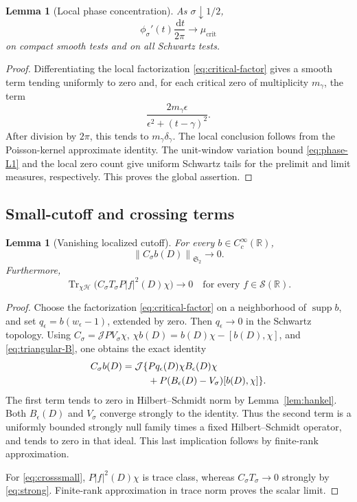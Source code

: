 \documentclass[11pt]{article}
\numberwithin{equation}{section}
\newtheorem{lemma}[theorem]{Lemma}
\theoremstyle{definition}
\theoremstyle{remark}
\newcommand{\HH}{\mathcal H}
\newcommand{\Sch}{\mathcal S}
\newcommand{\Tr}{\operatorname{Tr}}
\newcommand{\J}{\mathcal J}
\newcommand{\Stwo}{\mathfrak S_2}
\newcommand{\norm}[1]{\left\lVert #1\right\rVert}
\newcommand{\dd}{\,\mathrm d}
\newcommand{\mucrit}{\mu_{\mathrm{crit}}}
\begin{document}
\begin{lemma}[Local phase concentration]\label{lem:phase-limit}
As \(\sigma\downarrow1/2\),
\[
\phi_\sigma'(t)\frac{\dd t}{2\pi}\longrightarrow\mucrit
\]
on compact smooth tests and on all Schwartz tests.
\end{lemma}
\begin{proof}
Differentiating the local factorization \eqref{eq:critical-factor}
gives a smooth term tending uniformly to zero and, for each critical
zero of multiplicity \(m_\gamma\), the term
\[
\frac{2m_\gamma\epsilon}{\epsilon^2+(t-\gamma)^2}.
\]
After division by \(2\pi\), this tends to
\(m_\gamma\delta_\gamma\). The local conclusion follows from the
Poisson-kernel approximate identity. The unit-window variation bound
\eqref{eq:phase-L1} and the local zero count give uniform Schwartz
tails for the prelimit and limit measures, respectively.
This proves the global assertion.
\end{proof}

\subsection{Small-cutoff and crossing terms}

\begin{lemma}[Vanishing localized cutoff]\label{lem:Csmall}
For every \(b\in C_c^\infty(\mathbb R)\),
\begin{equation}\label{eq:Csmall}
\norm{C_\sigma b(D)}_{\Stwo}\longrightarrow0.
\end{equation}
Furthermore,
\begin{equation}\label{eq:crosssmall}
\Tr_{\chi\HH}\bigl(C_\sigma T_\sigma P|f|^2(D)\chi\bigr)
\longrightarrow0
\quad\text{for every } f\in\Sch(\mathbb R).
\end{equation}
\end{lemma}
\begin{proof}
Choose the factorization \eqref{eq:critical-factor} on a
neighborhood of \(\operatorname{supp}b\), and set
\(q_\epsilon=b(w_\epsilon-1)\), extended by zero.
Then \(q_\epsilon\to0\) in the Schwartz topology.
Using \(C_\sigma=\J P V_\sigma\chi\),
\(\chi b(D)=b(D)\chi-[b(D),\chi]\), and
\eqref{eq:triangular-B}, one obtains the exact identity
\begin{align}\label{eq:Csmall-id}
C_\sigma b(D)=\J\{&
Pq_\epsilon(D)\chi B_\epsilon(D)\chi\\
&+P(B_\epsilon(D)-V_\sigma)[b(D),\chi]\}.\notag
\end{align}
The first term tends to zero in Hilbert--Schmidt norm by
Lemma~\ref{lem:hankel}. Both \(B_\epsilon(D)\) and \(V_\sigma\)
converge strongly to the identity. Thus the second term is a
uniformly bounded strongly null family times a fixed
Hilbert--Schmidt operator, and tends to zero in that ideal.
This last implication follows by finite-rank approximation.

For \eqref{eq:crosssmall}, \(P|f|^2(D)\chi\) is trace class,
whereas \(C_\sigma T_\sigma\to0\) strongly by
\eqref{eq:strong}. Finite-rank approximation in trace norm
proves the scalar limit.
\end{proof}
\end{document}
